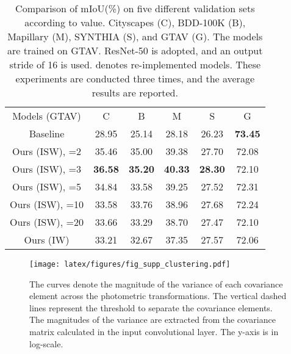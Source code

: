 \documentclass[final]{latex/cvpr}
\newcommand{\drule}{\specialrule{0.2pt}{1pt}{1pt}\specialrule{0.2pt}{0pt}{\belowrulesep}}
\begin{document}
\begin{table}[b!]
\vspace{-0.35cm}
\begin{center}
\footnotesize
\begin{tabular}{c|c|c|c|c||c}
\toprule
Models (GTAV) & C & B & M & S & G\\
\drule
Baseline & 28.95 & 25.14 & 28.18 & 26.23 & \textbf{73.45}  \\ 
\midrule
Ours (ISW), =2 & 35.46 & 35.00 & 39.38 & 27.70 & 72.08 \\ 
\midrule
Ours (ISW), =3 & \textbf{36.58} & \textbf{35.20} & \textbf{40.33} & \textbf{28.30} & 72.10 \\ 
\midrule
Ours (ISW), =5 & 34.84 & 33.58 & 39.25 & 27.52 & 72.31 \\ 
\midrule
Ours (ISW), =10 & 33.58 & 33.76 & 38.96 & 27.68 & 72.24 \\ 
\midrule
Ours (ISW), =20 & 33.66 &  33.29 & 38.70  &  27.47  &  72.10     \\ 
\midrule
Ours (IW) & 33.21 & 32.67 & 37.35 & 27.57 & 72.06 \\ 
\bottomrule
\end{tabular}
\end{center}
\vspace*{-0.0cm}
\caption{Comparison of mIoU(\%) on five different validation sets according to  value. Cityscapes (C), BDD-100K (B), Mapillary (M), SYNTHIA (S), and GTAV (G). The models are trained on GTAV. ResNet-50 is adopted, and an output stride of 16 is used.  denotes re-implemented models. These experiments are conducted three times, and the average results are reported.}
\label{tab_hyper_parameters1}
\vspace{-0.0cm}
\end{table}


\begin{figure}[t!]
\vspace{-0.1cm}
\centering
  \texttt{[image: latex/figures/fig\_supp\_clustering.pdf]}
  \vspace*{-0.0cm}
  \caption{The curves denote the magnitude of the variance of each covariance element across the photometric transformations. The vertical dashed lines represent the threshold to separate the covariance elements. The magnitudes of the variance are extracted from the covariance matrix calculated in the input convolutional layer. The y-axis is in log-scale.}
\label{fig:supp_cov_clustering}
\vspace*{-0.3cm}
\end{figure}
\end{document}

